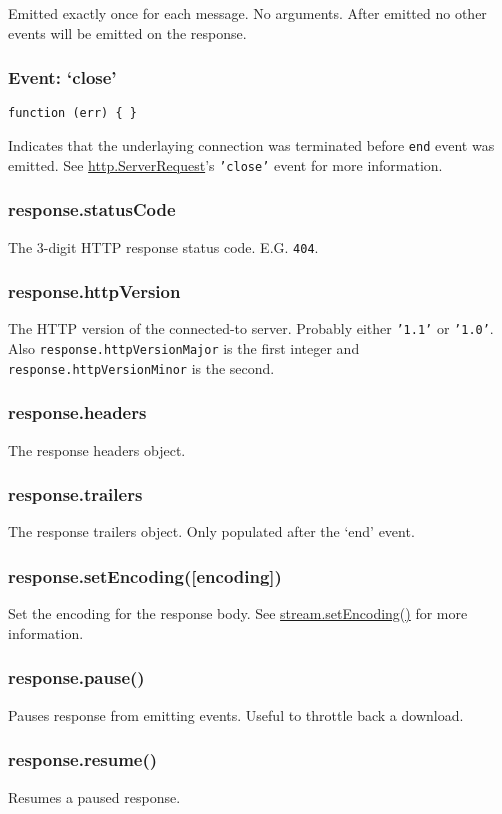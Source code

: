 Emitted exactly once for each message. No arguments. After emitted no
other events will be emitted on the response.

\subsubsection{Event: `close'}

\texttt{function (err) \{ \}}

Indicates that the underlaying connection was terminated before
\texttt{end} event was emitted. See
\hyperref[http\_class\_http\_serverrequest]{http.ServerRequest}'s
\texttt{'close'} event for more information.

\subsubsection{response.statusCode}

The 3-digit HTTP response status code. E.G. \texttt{404}.

\subsubsection{response.httpVersion}

The HTTP version of the connected-to server. Probably either
\texttt{'1.1'} or \texttt{'1.0'}. Also
\texttt{response.httpVersionMajor} is the first integer and
\texttt{response.httpVersionMinor} is the second.

\subsubsection{response.headers}

The response headers object.

\subsubsection{response.trailers}

The response trailers object. Only populated after the `end' event.

\subsubsection{response.setEncoding({[}encoding{]})}

Set the encoding for the response body. See
\href{stream.html\#stream\_stream\_setencoding\_encoding}{stream.setEncoding()}
for more information.

\subsubsection{response.pause()}

Pauses response from emitting events. Useful to throttle back a
download.

\subsubsection{response.resume()}

Resumes a paused response.
